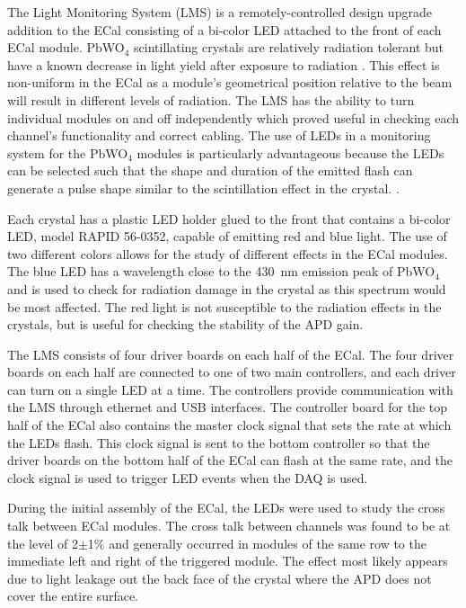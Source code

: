 The Light Monitoring System (LMS) is a remotely-controlled design upgrade addition to the ECal consisting of a bi-color LED attached to the front of each ECal module. PbWO$_4$ scintillating crystals are relatively radiation tolerant but have a known decrease in light yield after exposure to radiation \cite{Batarin2005543}. This effect is non-uniform in the ECal as a module's geometrical position relative to the beam will result in different levels of radiation. The LMS has the ability to turn individual modules on and off independently which proved useful in checking each channel's functionality and correct cabling. The use of LEDs in a monitoring system for the PbWO$_4$ modules is particularly advantageous because the LEDs can be selected such that the shape and duration of the emitted flash can generate a pulse shape similar to the scintillation effect in the crystal. \cite{battaglieri_ft_clas12}.

Each crystal has a plastic LED holder glued to the front that contains a bi-color LED, model RAPID 56-0352, capable of emitting red and blue light. The use of two different colors allows for the study of different effects in the ECal modules. The blue LED has a wavelength close to the 430~nm emission peak of PbWO$_4$  \cite{battaglieri_ft_clas12} and is used to check for radiation damage in the crystal as this spectrum would be most affected. The red light is not susceptible to the radiation effects in the crystals, but is useful for checking the stability of the  APD gain. 

The LMS consists of four driver boards on each half of the ECal. The four driver boards on each half are connected to one of two main controllers, and each driver can turn on a single LED at a time. The controllers provide communication with the LMS through ethernet and USB interfaces. The controller board for the top half of the ECal also contains the master clock signal that sets the rate at which the LEDs flash. This clock signal is sent to the bottom controller so that the driver boards on the bottom half of the ECal can flash at the same rate, and the clock signal is used to trigger LED events when the DAQ is used. 


During the initial assembly of the ECal, the LEDs were used to study the cross talk between ECal modules. The cross talk between channels was found to be at the level of 2$\pm$1$\%$ and generally occurred in modules of the same row to the immediate left and right of the triggered module. The effect most likely appears due to light leakage out the back face of the crystal where the APD does not cover the entire surface.

